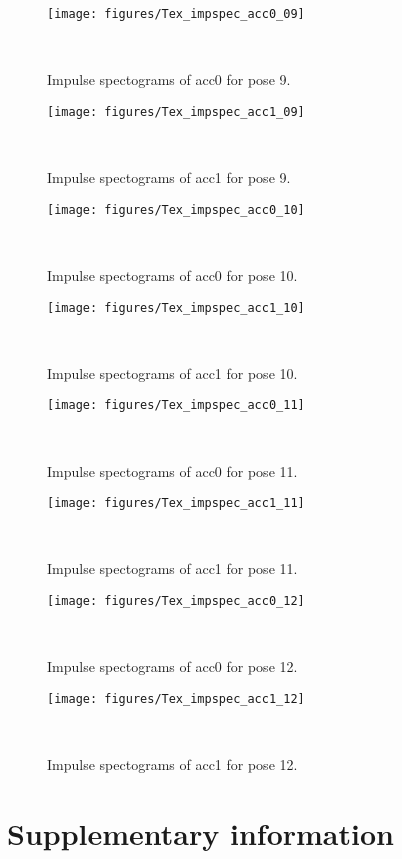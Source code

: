 \documentclass{sigchi}
\begin{document}
\begin{figure*}
  \centering
  \texttt{[image: figures/Tex\_impspec\_acc0\_09]}
  \caption{Impulse spectograms of acc0 for pose 9.}
    ~\label{fig:Tex_impspec_acc0_09}
\end{figure*}

\begin{figure*}
  \centering
  \texttt{[image: figures/Tex\_impspec\_acc1\_09]}
  \caption{Impulse spectograms of acc1 for pose 9.}
    ~\label{fig:Tex_impspec_acc1_09}
\end{figure*}

\begin{figure*}
  \centering
  \texttt{[image: figures/Tex\_impspec\_acc0\_10]}
  \caption{Impulse spectograms of acc0 for pose 10.}
    ~\label{fig:Tex_impspec_acc0_10}
\end{figure*}

\begin{figure*}
  \centering
  \texttt{[image: figures/Tex\_impspec\_acc1\_10]}
  \caption{Impulse spectograms of acc1 for pose 10.}
    ~\label{fig:Tex_impspec_acc1_10}
\end{figure*}

\begin{figure*}
  \centering
  \texttt{[image: figures/Tex\_impspec\_acc0\_11]}
  \caption{Impulse spectograms of acc0 for pose 11.}
    ~\label{fig:Tex_impspec_acc0_11}
\end{figure*}

\begin{figure*}
  \centering
  \texttt{[image: figures/Tex\_impspec\_acc1\_11]}
  \caption{Impulse spectograms of acc1 for pose 11.}
    ~\label{fig:Tex_impspec_acc1_11}
\end{figure*}
\begin{figure*}
  \centering
  \texttt{[image: figures/Tex\_impspec\_acc0\_12]}
  \caption{Impulse spectograms of acc0 for pose 12.}
    ~\label{fig:Tex_impspec_acc0_12}
\end{figure*}

\begin{figure*}
  \centering
  \texttt{[image: figures/Tex\_impspec\_acc1\_12]}
  \caption{Impulse spectograms of acc1 for pose 12.}
    ~\label{fig:Tex_impspec_acc1_12}
\end{figure*}


\section{Supplementary information}
\end{document}
